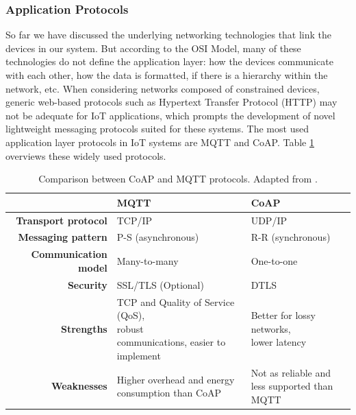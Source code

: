 \subsubsection{Application Protocols}

So far we have discussed the underlying networking technologies that link the devices in our system. But according to the OSI Model, many of these technologies do not define the application layer: how the devices communicate with each other, how the data is formatted, if there is a hierarchy within the network, etc. When considering networks composed of constrained devices, generic web-based protocols such as Hypertext Transfer Protocol (HTTP) may not be adequate for \acs{IoT} applications, which prompts the development of novel lightweight messaging protocols suited for these systems. The most used application layer protocols in \acs{IoT} systems are \acf{MQTT} and \acf{CoAP}. Table \ref{tab:comparsion-applicationprotocols} overviews these widely used protocols. \bigskip

\renewcommand{\arraystretch}{1.5}
\begin{table}[H]
    \centering
    \begin{tabular}{r|l|l}
        & \textbf{\acs{MQTT}}& \textbf{\acs{CoAP}}  \\ \hline
        \textbf{Transport protocol} & TCP/IP & UDP/IP \\
        \textbf{Messaging pattern} & P-S (asynchronous) & R-R (synchronous) \\
        \textbf{Communication model} & Many-to-many & One-to-one \\
        \textbf{Security} & SSL/TLS (Optional) & DTLS \\
        \textbf{Strengths} & \makecell{TCP and Quality of Service (QoS),\\ robust \\communications, easier to implement } & \makecell{Better for lossy networks,\\ lower latency} \\
        \textbf{Weaknesses} & \makecell{Higher overhead and energy\\ consumption than \acs{CoAP}} & \makecell{Not as reliable and \\less supported than MQTT} \\
    \end{tabular}
    \caption[Comparison between \acs{CoAP} and \acs{MQTT} protocols.]{Comparison between \acs{CoAP} and \acs{MQTT} protocols. Adapted from \cite{10.5555/3161403}.}
    \label{tab:comparsion-applicationprotocols}
\end{table} 
\renewcommand{\arraystretch}{1}

